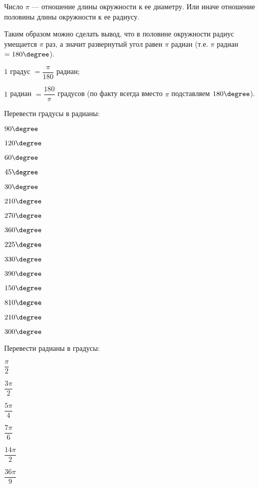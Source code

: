 \begin{class}[number=4]
	\begin{definit}
		Число \( \pi \) --- отношение длины окружности к ее диаметру. Или иначе отношение половины длины окружности к ее радиусу.
	\end{definit}
	Таким образом можно сделать вывод, что в половине окружности радиус умещается \( \pi \) раз, а значит развернутый угол равен \( \pi \) радиан (т.е. \( \pi \) радиан \( = 180\degree \)).
	\begin{enumcols}
		\item \( 1 \) градус \( = \dfrac{\pi}{180} \) радиан;
		\item \( 1 \) радиан \( = \dfrac{180}{\pi}\) градусов (по факту всегда вместо \( \pi \) подставляем \( 180\degree \)).
	\end{enumcols}
	\begin{listofex}[resume]
		\item Перевести градусы в радианы:
		\begin{enumcols}[itemcolumns=5]
			\item \( 90\degree \)
			\item \( 120\degree \)
			\item \( 60\degree \)
			\item \( 45\degree \)
			\item \( 30\degree \)
			\item \( 210\degree \)
			\item \( 270\degree \)
			\item \( 360\degree \)
			\item \( 225\degree \)
			\item \( 330\degree \)
			\item \( 390\degree \)
			\item \( 150\degree \)
			\item \( 810\degree \)
			\item \( 210\degree \)
			\item \( 300\degree \)
		\end{enumcols}
		\newpage
		\item Перевести радианы в градусы:
		\begin{enumcols}[itemcolumns=5]
			\item \( \dfrac{\pi}{2} \)
			\item \( \dfrac{3\pi}{2} \)
			\item \( \dfrac{5\pi}{4} \)
			\item \( \dfrac{7\pi}{6} \)
			\item \( \dfrac{14\pi}{2} \)
			\item \( \dfrac{36\pi}{9} \)

\end{enumcols}
\end{listofex}
\end{class}
